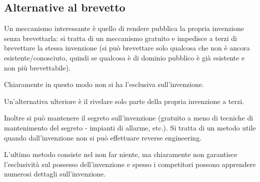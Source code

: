 \subsection{Alternative al brevetto}
Un meccanismo interessante è quello di rendere pubblica la propria invenzione senza brevettarla: si tratta di un meccanismo gratuito e impedisce a terzi di brevettare la stessa invenzione (si può brevettare solo qualcosa che non è ancora esistente/conosciuto, quindi se qualcosa è di dominio pubblico è già esistente e non più brevettabile). 

Chiaramente in questo modo non si ha l'esclusiva sull'invenzione.\bigskip

Un'alternativa ulteriore è il rivelare solo parte della propria invenzione a terzi. \bigskip

Inoltre si può mantenere il segreto sull'invenzione (gratuito a meno di tecniche di mantenimento del segreto - impianti di allarme, etc.). Si tratta di un metodo utile quando dall'invenzione non si può effettuare reverse engineering.\bigskip

L'ultimo metodo consiste nel non far niente, ma chiaramente non garantisce l'esclusività sul possesso dell'invenzione e spesso i competitori possono apprendere numerosi dettagli sull'invenzione.
